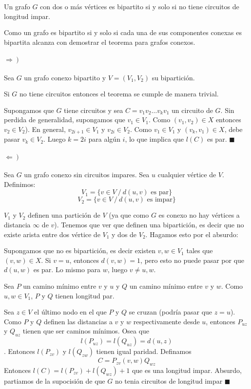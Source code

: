 \begin{theorem}
	Un grafo \(G\) con dos o más vértices es bipartito si y solo si no tiene circuitos de longitud impar.
\end{theorem}
\begin{demo}
	Como un grafo es bipartito si y solo si cada una de sus componentes conexas es bipartita alcanza con demostrar el teorema para grafos conexos. 
	\paragraph{\(\left.\Rightarrow\right) \)} Sea \(G\) un grafo conexo bipartito y \(V = (V_1,V_2)\) su bipartición.
	
	Si \(G\) no tiene circuitos entonces el teorema se cumple de manera trivial.
	
	Supongamos que \(G\) tiene circuitos y sea \(C = v_1v_2\dots v_kv_1\) un circuito de \(G\). Sin perdida de generalidad, supongamos que \(v_1\in V_1\). Como \((v_1,v_2) \in X\) entonces \(v_2\in V_2\)). En general, \(v_{2i + 1}\in V_1\) y \(v_{2i}\in V_2\). Como \(v_1\in V_1\) y \((v_k,v_1)\in X\), debe pasar \(v_k\in V_2\). Luego \(k = 2i\) para algún \(i\), lo que implica que \(l(C)\) es par. \(\blacksquare\)
\end{demo}
\begin{demoPart}
	
	\paragraph{\(\left.\Leftarrow\right)\)} Sea \(G\) un grafo conexo sin circuitos impares. Sea \(u\) cualquier vértice de \(V\). Definimos: \[V_1 = \{ v\in V~/~d(u,v) \text{ es par}\}\] \[V_2 = \{ v\in V~/~d(u,v) \text{ es impar}\}\]

	\(V_1\) y \(V_2\) definen una partición de \(V\) (ya que como \(G\) es conexo no hay vértices a distancia \(\infty\) de \(v\)). Tenemos que ver que definen una bipartición, es decir que no existe arista entre dos vértice de \(V_1\) y dos de \(V_2\). Hagamos esto por el absurdo:
	
	Supongamos que no es bipartición, es decir existen \(v,w\in V_1\) tales que \((v,w)\in X\). Si \(v = u\), entonces \(d(v,w) = 1\), pero esto no puede pasar por que \(d(u,w) \) es par. Lo mismo para \(w\), luego \(v\neq u,w\).
	
	Sea \(P\) un camino mínimo entre \(v\) y \(u\) y \(Q\) un camino mínimo entre \(v\) y \(w\). Como \(u,w\in V_1\), \(P\) y \(Q\) tienen longitud par.
	
	Sea \(z\in V\) el último nodo en el que \(P\) y \(Q\) se cruzan (podría pasar que \(z = u\)). Como \(P\) y \(Q\) definen las distancias a \(v\) y \(w\) respectivamente desde \(u\), entonces \(P_{uz}\) y \(Q_{uz}\) tienen que ser caminos mínimos. Osea que \[l(P_{uz}) = l(Q_{uz}) = d(u,z)\].
	Entonces \(l(P_{zv})\) y \(l(Q_{zw})\) tienen igual paridad. Definamos \[C = P_{zv}(v,w)Q_{wz}\]
	Entonces \(l(C) = l(P_{zv}) + l(Q_{wz}) + 1\) que es una longitud impar. Absurdo, partiamos de la supocisión de que \(G\) no tenia circuitos de longitud impar \(\blacksquare\)
\end{demoPart}


